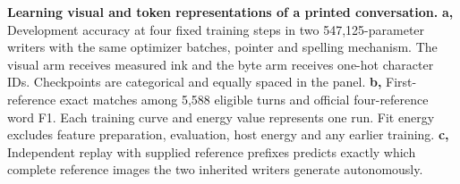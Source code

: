 \textbf{Learning visual and token representations of a printed conversation.}
\textbf{a,} Development accuracy at four fixed training steps in two 547,125-parameter writers with the same optimizer batches, pointer and spelling mechanism. The visual arm receives measured ink and the byte arm receives one-hot character IDs. Checkpoints are categorical and equally spaced in the panel.
\textbf{b,} First-reference exact matches among 5,588 eligible turns and official four-reference word F1. Each training curve and energy value represents one run. Fit energy excludes feature preparation, evaluation, host energy and any earlier training.
\textbf{c,} Independent replay with supplied reference prefixes predicts exactly which complete reference images the two inherited writers generate autonomously.
